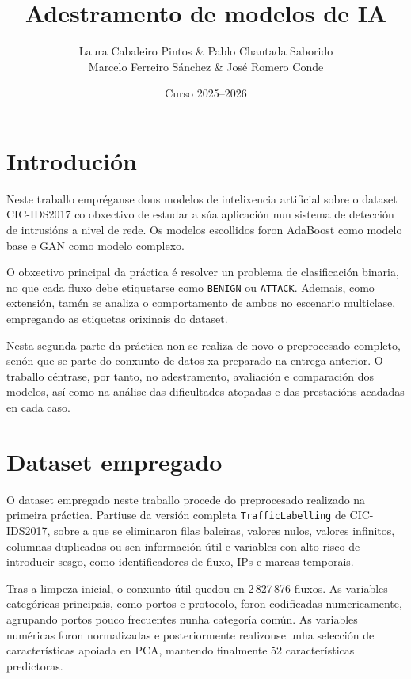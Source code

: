 \documentclass[12pt,a4paper]{article}
\title{Adestramento de modelos de IA}
\author{Laura Cabaleiro Pintos \& Pablo Chantada Saborido \\ Marcelo Ferreiro Sánchez \& José Romero Conde}
\date{Curso 2025--2026}
\begin{document}
\maketitle

\newpage

\tableofcontents

\newpage

\section{Introdución}

Neste traballo empréganse dous modelos de intelixencia artificial sobre o
dataset CIC-IDS2017 co obxectivo de estudar a súa aplicación nun sistema de
detección de intrusións a nivel de rede. Os modelos escollidos foron
AdaBoost \cite{freund1996experiments} como modelo base e
GAN \cite{goodfellow2014generative} como modelo complexo.

O obxectivo principal da práctica é resolver un problema de clasificación
binaria, no que cada fluxo debe etiquetarse como \texttt{BENIGN} ou
\texttt{ATTACK}. Ademais, como extensión, tamén se analiza o comportamento
de ambos no escenario multiclase, empregando as etiquetas orixinais do
dataset.

Nesta segunda parte da práctica non se realiza de novo o preprocesado
completo, senón que se parte do conxunto de datos xa preparado na entrega
anterior. O traballo céntrase, por tanto, no adestramento, avaliación e
comparación dos modelos, así como na análise das dificultades atopadas e das
prestacións acadadas en cada caso.

\section{Dataset empregado}

O dataset empregado neste traballo procede do preprocesado realizado na primeira práctica. 
Partiuse da versión completa \texttt{TrafficLabelling} de CIC-IDS2017, sobre a que se eliminaron filas baleiras, valores nulos, valores infinitos, 
columnas duplicadas ou sen información útil e variables con alto risco de introducir sesgo, como identificadores de fluxo, IPs e marcas temporais.

Tras a limpeza inicial, o conxunto útil quedou en 2\,827\,876 fluxos. As variables categóricas principais, como portos e protocolo, foron codificadas 
numericamente, agrupando portos pouco frecuentes nunha categoría común. As variables numéricas foron normalizadas e posteriormente realizouse unha 
selección de características apoiada en PCA, mantendo finalmente 52 características predictoras.
\end{document}
